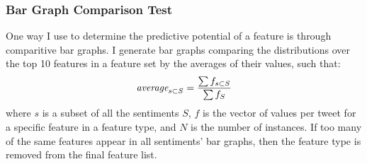 \documentclass[11pt]{article}
\begin{document}
\subsubsection{Bar Graph Comparison Test}\label{sec:bargraphs}

One way I use to determine the predictive potential of a feature is through comparitive bar graphs.
I generate bar graphs comparing the distributions over the top 10 features in a feature set by the averages of their values, such that:
\begin{equation*}
	\emph{average}_{s \subset S} = \frac{\sum f_{s \subset S}}{\sum f_S}
\end{equation*}
where $s$ is a subset of all the sentiments $S$, $f$ is the vector of values per tweet for a specific feature in a feature type, and $N$ is the number of instances.
If too many of the same features appear in all sentiments' bar graphs, then the feature type is removed from the final feature list.

\subsubsection{}




\end{document}
